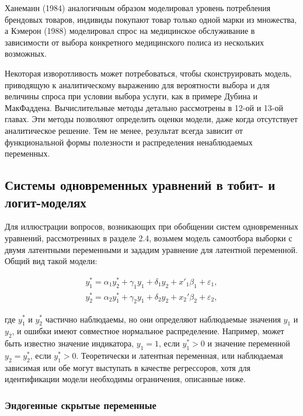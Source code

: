 Ханеманн (1984) аналогичным образом моделировал уровень потребления брендовых товаров,  индивиды покупают товар только одной марки из множества, а Кэмерон (1988) моделировал спрос на медицинское обслуживание в зависимости от выбора конкретного медицинского полиса из нескольких возможных.

Некоторая изворотливость может потребоваться, чтобы сконструировать модель, приводящую к аналитическому выражению для вероятности выбора и для величины спроса при условии выбора услуги, как в примере Дубина и МакФаддена. Вычислительные методы детально рассмотрены в 12-ой и 13-ой главах. Эти методы позволяют определить оценки модели, даже когда отсутствует аналитическое решение. Тем не менее, результат всегда зависит от функциональной формы полезности и распределения ненаблюдаемых переменных.

\subsection{Системы одновременных уравнений в тобит- и логит-моделях}

Для иллюстрации вопросов, возникающих при обобщении систем одновременных уравнений, рассмотренных в разделе 2.4, возьмем модель самоотбора выборки с двумя латентными переменными и зададим уравнение для латентной переменной. Общий вид такой модели:

\begin{equation}
\begin{array}{l}
y_1^{*}=\alpha_1y_2^{*}+\gamma_1y_1+\delta_1y_2+x'_1\beta_1+\varepsilon_1,\\
y_2^{*}=\alpha_2y_1^{*}+\gamma_2y_1+\delta_2y_2+x_2'\beta_2+\varepsilon_2,
\end{array}
\end{equation}

где $y_1^{*}$ и $y_2^{*}$ частично наблюдаемы, но они определяют наблюдаемые значения $y_1$ и $y_2$, и ошибки имеют совместное нормальное распределение. Например, может быть известно значение индикатора, $y_1=1$, если $y_1^{*}>0$ и значение переменной $y_2=y_2^{*}$, если $y_1^{*}>0$. Теоретически и латентная переменная, или  наблюдаемая зависимая или обе  могут выступать в качестве регрессоров, хотя для идентификации модели необходимы ограничения, описанные ниже.

\subsubsection*{Эндогенные скрытые переменные}


